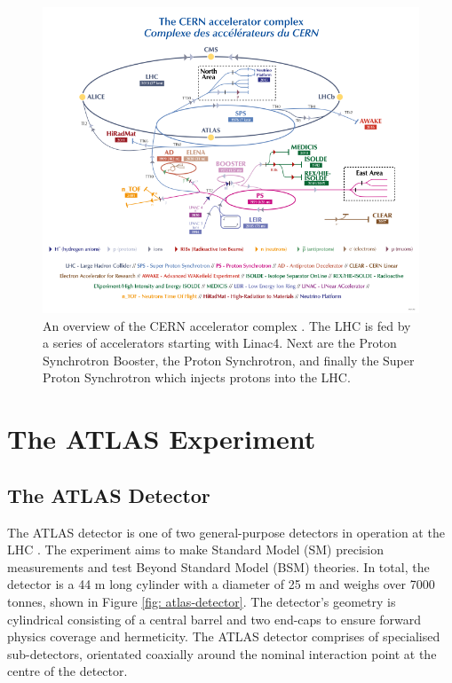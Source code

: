 \begin{figure}[htb!]
\includegraphics[width=\textwidth]{images/2-LHC-ATLAS/accelerator_complex.pdf}
\caption{An overview of the CERN accelerator complex \cite{CERN:2012:accelerators}. The \ac{LHC} is fed by a series of accelerators starting with Linac4. Next are the Proton Synchrotron Booster, the Proton Synchrotron, and finally the Super Proton Synchrotron which injects protons into the \ac{LHC}.}
\label{fig: accelerator-complex}
\end{figure}



\section{The ATLAS Experiment}
\label{atlas-section}

\subsection{The ATLAS Detector}
The ATLAS detector is one of two general-purpose detectors in operation at the \ac{LHC} \cite{PERF-2007-01}. The experiment aims to make Standard Model (SM) precision measurements and test Beyond Standard Model (BSM) theories. In total, the detector is a 44 m long cylinder with a diameter of 25 m and weighs over 7000 tonnes, shown in Figure \ref{fig: atlas-detector}. The detector’s geometry is cylindrical consisting of a central barrel and two end-caps to ensure forward physics coverage and hermeticity. The ATLAS detector comprises of specialised sub-detectors, orientated coaxially around the nominal interaction point at the centre of the detector. 

